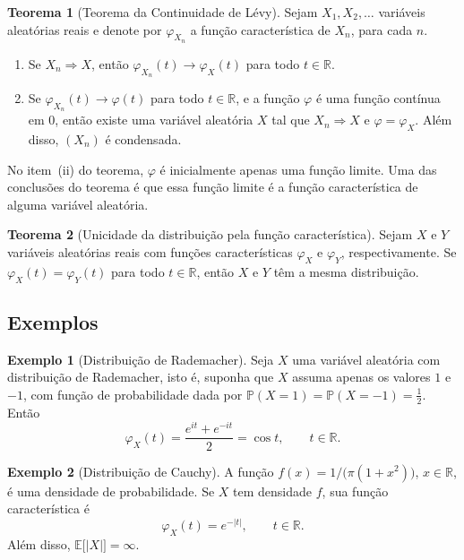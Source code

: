 \documentclass[12pt,portuguese]{article}
\theoremstyle{definition}
\newtheorem{theorem}{Teorema}
\newtheorem{example}[example]{Exemplo}
\theoremstyle{plainexercise}
\theoremstyle{starredexercise}
\theoremstyle{definition}
\begin{document}
\begin{theorem}[Teorema da Continuidade de Lévy]\label{thm:continuidade}
Sejam $X_1,X_2,\ldots$ variáveis aleatórias reais e denote por
$\varphi_{X_n}$ a função característica de $X_n$, para cada $n$.

\begin{enumerate}[label=\textup{(\roman*)}]
\item Se $X_n\Rightarrow X$, então
$\varphi_{X_n}(t)\to\varphi_X(t)$ para todo $t\in\mathbb{R}$.

\item Se $\varphi_{X_n}(t)\to\varphi(t)$ para todo $t\in\mathbb{R}$, e a função
$\varphi$ é uma função contínua em $0$, então existe uma variável aleatória $X$ tal que
$X_n\Rightarrow X$ e $\varphi=\varphi_X$. Além disso, $(X_n)$ é condensada.
\end{enumerate}
\end{theorem}

No item~(ii) do teorema, $\varphi$ é inicialmente apenas uma função
limite. Uma das conclusões do teorema é que essa função limite é a função
característica de alguma variável aleatória.

\begin{theorem}[Unicidade da distribuição pela função característica]\label{thm:unicidade-fc}
Sejam $X$ e $Y$ variáveis aleatórias reais com funções características
$\varphi_X$ e $\varphi_Y$, respectivamente. Se $\varphi_X(t)=\varphi_Y(t)$ para
todo $t\in\mathbb{R}$, então $X$ e $Y$ têm a mesma distribuição.
\end{theorem}

\subsection{Exemplos}\label{subsec:aux-exemplos}

\begin{example}[Distribuição de Rademacher]\label{ex:rademacher}
Seja $X$ uma variável aleatória com distribuição de Rademacher, isto é, suponha
que $X$ assuma apenas os valores $1$ e $-1$, com função de probabilidade dada por
$\mathbb{P}(X=1)=\mathbb{P}(X=-1)=\tfrac12$. Então
\[
\varphi_X(t)=\frac{e^{it}+e^{-it}}{2}=\cos t, \qquad t\in\mathbb{R}.
\]
\end{example}

\begin{example}[Distribuição de Cauchy]\label{ex:cauchy}
A função $f(x)=1/\bigl(\pi(1+x^{2})\bigr)$, $x\in\mathbb{R}$, é uma densidade de
probabilidade. Se $X$ tem densidade $f$, sua função característica é
\[
\varphi_X(t)=e^{-|t|}, \qquad t\in\mathbb{R}.
\]
Além disso, $\mathbb{E}\bigl[|X|\bigr]=\infty$.
\end{example}
\end{document}
